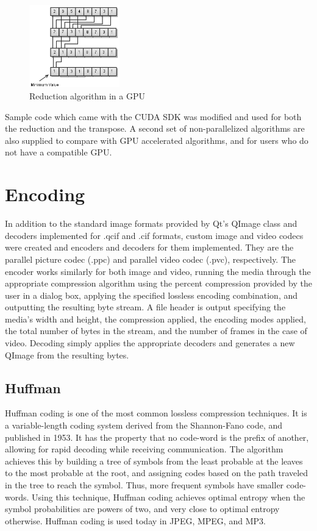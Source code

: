 \documentclass[10pt,twocolumn,twoside]{IEEEtran}
\begin{document}
\begin{figure}[htbp]
\begin{center}
\includegraphics[width=0.35\textwidth]{Images/reduction.png}
\caption{Reduction algorithm in a GPU}
\label{fig:reduction}
\end{center}
\end{figure}

Sample code which came with the CUDA SDK was modified and used for both the reduction and the transpose. A second set of non-parallelized algorithms are also supplied to compare with GPU accelerated algorithms, and for users who do not have a compatible GPU.

\section{Encoding}
In addition to the standard image formats provided by Qt's QImage class and decoders implemented for .qcif and .cif formats, custom image and video codecs were created and encoders and decoders for them implemented. They are the parallel picture codec (.ppc) and parallel video codec (.pvc), respectively. The encoder works similarly for both image and video, running the media through the appropriate compression algorithm using the percent compression provided by the user in a dialog box, applying the specified lossless encoding combination, and outputting the resulting byte stream. A file header is output specifying the media's width and height, the compression applied, the encoding modes applied, the total number of bytes in the stream, and the number of frames in the case of video. Decoding simply applies the appropriate decoders and generates a new QImage from the resulting bytes.

\subsection{Huffman}
Huffman coding is one of the most common lossless compression techniques. It is a variable-length coding system derived from the Shannon-Fano code, and published in 1953. It has the property that no code-word is the prefix of another, allowing for rapid decoding while receiving communication. The algorithm achieves this by building a tree of symbols from the least probable at the leaves to the most probable at the root, and assigning codes based on the path traveled in the tree to reach the symbol. Thus, more frequent symbols have smaller code-words. Using this technique, Huffman coding achieves optimal entropy when the symbol probabilities are powers of two, and very close to optimal entropy otherwise. Huffman coding is used today in JPEG, MPEG, and MP3.
\end{document}
